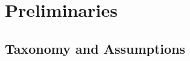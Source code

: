 




\vspace{-3.5mm}

\section{Preliminaries} \label{preliminaries}


%

\vspace{-1mm}

\subsection{Taxonomy and Assumptions}\label{Notations-and-Assumptions}
\vspace{-1mm}



